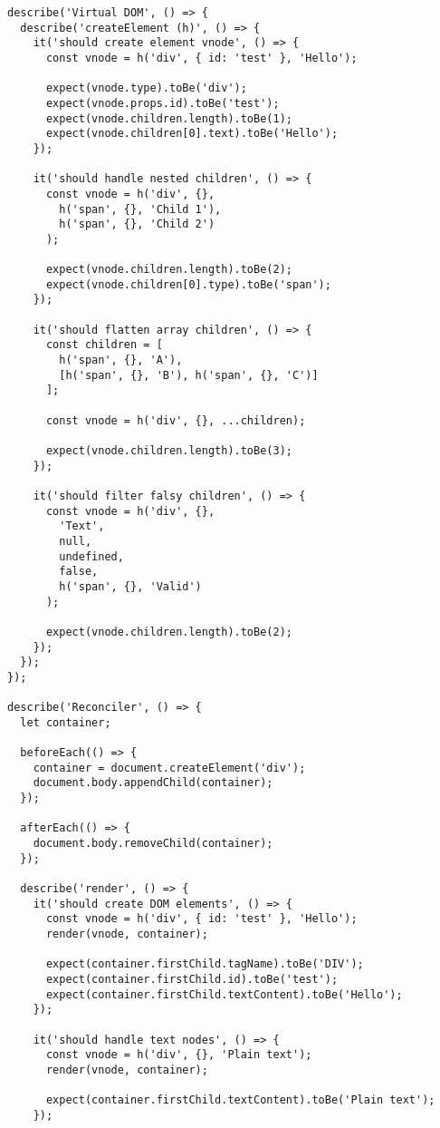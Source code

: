 \documentclass[11pt]{article}
\begin{document}
\begin{verbatim}
describe('Virtual DOM', () => {
  describe('createElement (h)', () => {
    it('should create element vnode', () => {
      const vnode = h('div', { id: 'test' }, 'Hello');
      
      expect(vnode.type).toBe('div');
      expect(vnode.props.id).toBe('test');
      expect(vnode.children.length).toBe(1);
      expect(vnode.children[0].text).toBe('Hello');
    });
    
    it('should handle nested children', () => {
      const vnode = h('div', {},
        h('span', {}, 'Child 1'),
        h('span', {}, 'Child 2')
      );
      
      expect(vnode.children.length).toBe(2);
      expect(vnode.children[0].type).toBe('span');
    });
    
    it('should flatten array children', () => {
      const children = [
        h('span', {}, 'A'),
        [h('span', {}, 'B'), h('span', {}, 'C')]
      ];
      
      const vnode = h('div', {}, ...children);
      
      expect(vnode.children.length).toBe(3);
    });
    
    it('should filter falsy children', () => {
      const vnode = h('div', {},
        'Text',
        null,
        undefined,
        false,
        h('span', {}, 'Valid')
      );
      
      expect(vnode.children.length).toBe(2);
    });
  });
});

describe('Reconciler', () => {
  let container;
  
  beforeEach(() => {
    container = document.createElement('div');
    document.body.appendChild(container);
  });
  
  afterEach(() => {
    document.body.removeChild(container);
  });
  
  describe('render', () => {
    it('should create DOM elements', () => {
      const vnode = h('div', { id: 'test' }, 'Hello');
      render(vnode, container);
      
      expect(container.firstChild.tagName).toBe('DIV');
      expect(container.firstChild.id).toBe('test');
      expect(container.firstChild.textContent).toBe('Hello');
    });
    
    it('should handle text nodes', () => {
      const vnode = h('div', {}, 'Plain text');
      render(vnode, container);
      
      expect(container.firstChild.textContent).toBe('Plain text');
    });
    

\end{verbatim}
\end{document}
